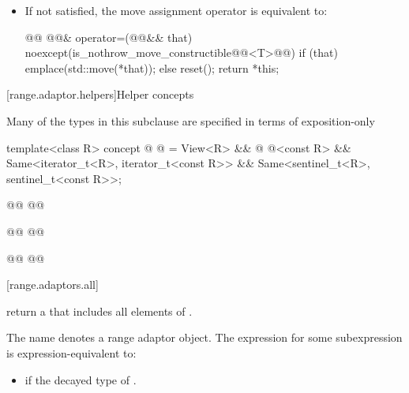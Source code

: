 {\begin{itemize}
\item If 
   not satisfied,
the move assignment operator is equivalent to:
\begin{codeblock}
@@ @@& operator=(@@&& that)
  noexcept(is_nothrow_move_constructible@@<T>@@)
{
  if (that) emplace(std::move(*that));
  else reset();
  return *this;
}
\end{codeblock}
\end{itemize}

[range.adaptor.helpers]{Helper concepts}

\pnum
Many of the types in this subclause are specified in terms of 
 exposition-only 

\begin{codeblock}
template<class R>
concept @ @ =
  View<R> && @ @<const R> &&
  Same<iterator_t<R>, iterator_t<const R>> &&
  Same<sentinel_t<R>, sentinel_t<const R>>;

@@
  @@

@@
  @@

@@
@@
\end{codeblock}

[range.adaptors.all]{}

\pnum
{}   return a
 that includes all elements of  
  .

\pnum
The name  denotes a range adaptor
object. The expression  for
some subexpression  is expression-equivalent to:

\begin{itemize}
\item {} if the decayed type of 
  .


\end{itemize}}
